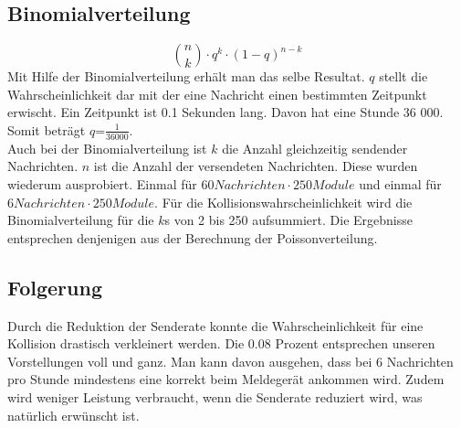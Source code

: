 \documentclass[a4paper]{article} %
\begin{document}
\subsection{Binomialverteilung}

\begin{equation}
	{n\choose k}\cdot q^{k} \cdot(1-q)^{n-k}
\end{equation}
Mit Hilfe der Binomialverteilung erhält man das selbe Resultat. $q$ stellt die Wahrscheinlichkeit dar mit der eine Nachricht einen bestimmten Zeitpunkt erwischt. Ein Zeitpunkt ist 0.1 Sekunden lang. Davon hat eine Stunde 36 000. Somit beträgt $q$=$\frac{1}{36 000}$.
\\Auch bei der Binomialverteilung ist $k$ die Anzahl gleichzeitig sendender Nachrichten. $n$ ist die Anzahl der versendeten Nachrichten. Diese wurden wiederum ausprobiert. Einmal für $60Nachrichten\cdot250Module$ und einmal für  $6Nachrichten\cdot250Module$.
Für die Kollisionswahrscheinlichkeit wird die Binomialverteilung für die $k$s von 2 bis 250 aufsummiert. Die Ergebnisse entsprechen denjenigen aus der Berechnung der Poissonverteilung.


\subsection{Folgerung}
Durch die Reduktion der Senderate konnte die Wahrscheinlichkeit für eine Kollision drastisch verkleinert werden. Die 0.08 Prozent entsprechen unseren Vorstellungen voll und ganz. Man kann davon ausgehen, dass bei 6 Nachrichten pro Stunde mindestens eine korrekt beim Meldegerät ankommen wird. Zudem wird weniger Leistung verbraucht, wenn die Senderate reduziert wird, was natürlich erwünscht ist.
\end{document}
